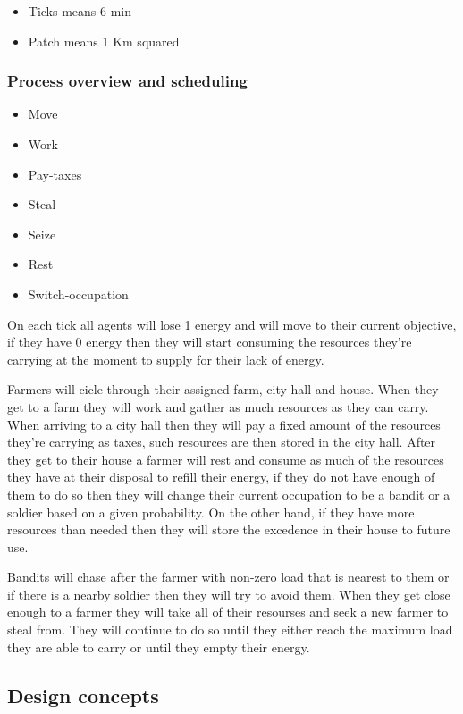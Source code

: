 \documentclass{wscpaperproc}
\theoremstyle{wsc}
\begin{document}
\begin{itemize}
    \item Ticks means 6 min
    \item Patch means 1 Km squared
\end{itemize}

\subsubsection{Process overview and scheduling}

\begin{itemize}
    \item Move
    \item Work
    \item Pay-taxes
    \item Steal
    \item Seize
    \item Rest
    \item Switch-occupation
\end{itemize}

On each tick all agents will lose 1 energy and will move to their current objective, if they have 0
energy then they will start consuming the resources they're carrying at the moment to supply for
their lack of energy.

Farmers will cicle through their assigned farm, city hall and house.
When they get to a farm they will work and gather as much resources as they can carry.
When arriving to a city hall then they will pay a fixed amount of the resources they're carrying as
taxes, such resources are then stored in the city hall.
After they get to their house a farmer will rest and consume as much of the resources they have at
their disposal to refill their energy, if they do not have enough of them to do so then they will
change their current occupation to be a bandit or a soldier based on a given probability. On the
other hand, if they have more resources than needed then they will store the excedence in their house
to future use.

Bandits will chase after the farmer with non-zero load that is nearest to them or if there is a nearby
soldier then they will try to avoid them.
When they get close enough to a farmer they will take all of their resourses and seek a new farmer to
steal from. They will continue to do so until they either reach the maximum load they are able to
carry or until they empty their energy.

\subsection{Design concepts}
\end{document}
